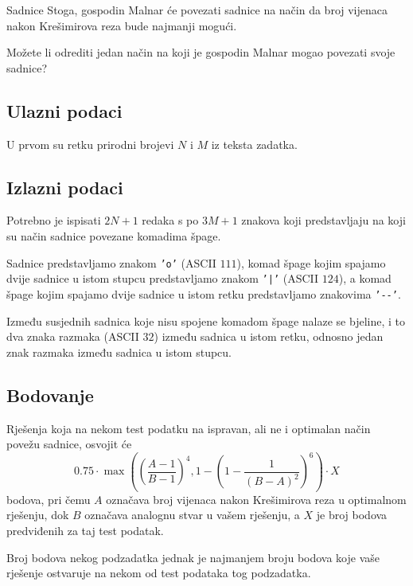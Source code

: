 \begin{statement}[
  problempoints=100,
  timelimit=3 sekunde,
  memorylimit=512 MiB,
]{Sadnice}
Stoga, gospodin Malnar će povezati sadnice na način da broj vijenaca nakon
Krešimirova reza bude najmanji mogući.

Možete li odrediti jedan način na koji je gospodin Malnar mogao povezati
svoje sadnice?

\subsection*{Ulazni podaci}
U prvom su retku prirodni brojevi $N$ i $M$ iz teksta zadatka.

\subsection*{Izlazni podaci}
Potrebno je ispisati $2N+1$ redaka s po $3M+1$ znakova koji predstavljaju
na koji su način sadnice povezane komadima špage.

Sadnice predstavljamo znakom \texttt{'o'} (ASCII $111$), komad špage kojim
spajamo dvije sadnice u istom stupcu predstavljamo znakom \texttt{'|'} (ASCII
$124$), a komad špage kojim spajamo dvije sadnice u istom retku predstavljamo
znakovima \texttt{'-{}-'}.

Između susjednih sadnica koje nisu spojene komadom
špage nalaze se bjeline, i to dva znaka razmaka (ASCII $32$) između sadnica u
istom retku, odnosno jedan znak razmaka između sadnica u istom stupcu.

\subsection*{Bodovanje}
Rješenja koja na nekom test podatku na ispravan, ali ne i optimalan način
povežu sadnice, osvojit će
$$ 0.75 \cdot \max \left(
\left( \frac{A - 1}{B - 1} \right)^4,
1 - \left( 1 - \frac{1}{(B - A)^2} \right)^6
\right) \cdot X$$
bodova, pri čemu $A$ označava broj vijenaca nakon Krešimirova reza u optimalnom
rješenju, dok $B$ označava analognu stvar u vašem rješenju, a $X$ je broj bodova
predviđenih za taj test podatak.

Broj bodova nekog podzadatka jednak je najmanjem broju bodova koje vaše rješenje
ostvaruje na nekom od test podataka tog podzadatka.


\end{statement}
